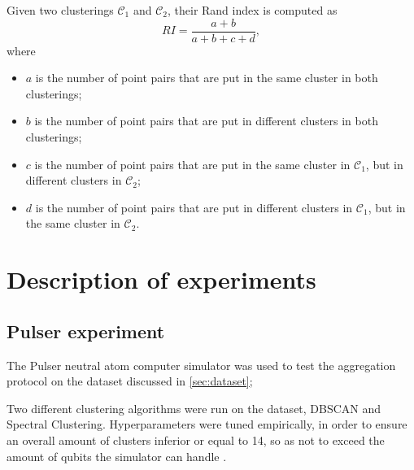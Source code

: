 Given two clusterings $\mathcal{C}_{1}$ and $\mathcal{C}_{2}$, their Rand index is computed as  
\begin{equation}
  \label{eqn:rand}
  RI = \frac{a + b}{a + b + c + d},
\end{equation}
where
\begin{itemize}
  \item $a$ is the number of point pairs that are put in the same cluster in both clusterings;
  \item $b$ is the number of point pairs that are put in different clusters in both clusterings; 
  \item $c$ is the number of point pairs that are put in the same cluster in $\mathcal{C}_{1}$, but in different clusters in $\mathcal{C}_{2}$;
  \item $d$ is the number of point pairs that are put in different clusters in $\mathcal{C}_{1}$, but in the same cluster in $\mathcal{C}_{2}$.
\end{itemize}

\section{Description of experiments}

\subsection{Pulser experiment}
The Pulser neutral atom computer simulator was used to test the aggregation protocol on the dataset discussed in \ref{sec:dataset}; 

Two different clustering algorithms were run on the dataset, DBSCAN and Spectral Clustering. Hyperparameters were tuned empirically, in order to ensure an overall amount of clusters inferior or equal to 14, so as not to exceed the amount of qubits the simulator can handle \cite{Johansson2012}.

\begin{figure}
  \centering 
  
\end{figure}